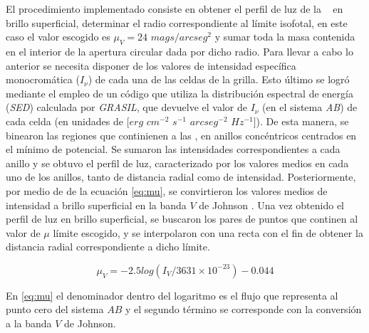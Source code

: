 El procedimiento implementado consiste en obtener el perfil de luz de la \bcg~ en brillo 
superficial, determinar el radio correspondiente al l\'imite isofotal,
en este caso el valor escogido es $\mu_{V}=24$ $mags/arcseg^{2}$
y sumar toda la masa contenida en el interior de la apertura circular dada por dicho radio.
Para llevar a cabo lo anterior se necesita disponer de los valores 
de intensidad espec\'ifica monocrom\'atica ($I_{\nu}$) de cada una de las celdas de la
grilla. Esto \'ultimo se logr\'o mediante el empleo de un 
c\'odigo que utiliza la distribuci\'on espectral de energ\'ia (\textit{SED}) calculada por \textit{GRASIL}, que devuelve el valor de    
$I_{\nu}$ (en el sistema \textit{AB}) de cada celda (en unidades de $[erg$ $cm^{-2}$ $s^{-1}$ $arcseg^{-2}$ $Hz^{-1}]$).
De esta manera, se binearon las regiones que continienen a las \bcgs, en anillos conc\'entricos 
centrados en el m\'inimo de potencial. Se sumaron las intensidades correspondientes a cada anillo
y se obtuvo el perfil de luz, caracterizado por los valores medios en 
cada uno de los anillos, tanto de distancia radial como de intensidad.
Posteriormente, por medio de de la ecuaci\'on \ref{eq:mu}, se convirtieron los 
valores medios de intensidad a brillo superficial en la banda $V$ de Johnson . 
Una vez obtenido el perfil de luz en brillo superficial,
se buscaron los pares de puntos que continen al valor de $\mu$ l\'imite escogido,
y se interpolaron con una recta con el fin de  obtener la distancia radial correspondiente a dicho l\'imite.


\begin{equation}\label{eq:mu}
 \mu_{V}=-2.5log(I_{V}/3631\times10^{-23}) -0.044
\end{equation}

En \ref{eq:mu} el denominador dentro del logaritmo es el flujo que representa al punto cero del sistema $AB$ y el segundo t\'ermino
se corresponde con la conversi\'on a la banda $V$ de Johnson. 










